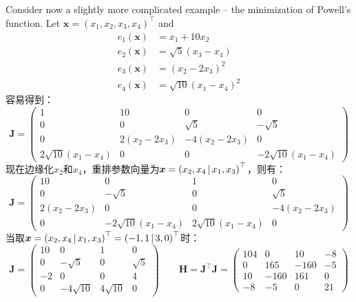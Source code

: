 \documentclass[12pt, onecolumn]{article}
\newcommand\normf{\fangsong}
\begin{document}
	\subsection{\normf{测试案例}}
	Consider now a slightly more complicated example – the minimization of Powell’s function. Let $\boldsymbol{x}=\left( x_1,x_2,x_3,x_4\right) ^\top$ and
	\begin{equation}
	\begin{aligned}
	e_1(\boldsymbol{x})&=x_1+10x_2\\
	e_2(\boldsymbol{x})&=\sqrt{5}\left( x_3-x_4\right) \\
	e_3(\boldsymbol{x})&=\left(x_2-2x_3 \right) ^2\\
	e_4(\boldsymbol{x})&=\sqrt{10}\left( x_1-x_4\right) ^2
	\end{aligned}
	\end{equation}
	容易得到：
	\begin{equation}
	\boldsymbol{J}=\begin{pmatrix}
	1&10&0&0\\
	0&0&\sqrt{5}&-\sqrt{5}\\
	0&2\left( x_2-2x_3\right) &-4\left( x_2-2x_3\right) &0\\
	2\sqrt{10}\left(x_1-x_4 \right) &0&0&-2\sqrt{10}\left(x_1-x_4 \right)
	\end{pmatrix}
	\end{equation}
	现在边缘化$x_2$和$x_4$，重排参数向量为$\boldsymbol{x}=\left( x_2,x_4\;\vline\; x_1,x_3\right) ^\top$，则有：
	\begin{equation}
	\boldsymbol{J}=\left( \begin{array}{cc|cc}
	10&0&1&0\\
	0&-\sqrt{5}&0&\sqrt{5}\\
	2\left( x_2-2x_3\right)&0&0&-4\left( x_2-2x_3\right)\\
	0&-2\sqrt{10}\left(x_1-x_4 \right)&2\sqrt{10}\left(x_1-x_4 \right) &0
	\end{array}\right) 
	\end{equation}
	当取$\boldsymbol{x}=\left( x_2,x_4\;\vline\; x_1,x_3\right) ^\top=\left( -1,1\;\vline\; 3,0\right) ^\top$时：
	\begin{equation}
	\boldsymbol{J}=\left( \begin{array}{cc|cc}
	10&0&1&0\\
	0&-\sqrt{5}&0&\sqrt{5}\\
	-2&0&0&4\\
	0&-4\sqrt{10}&4\sqrt{10}&0
	\end{array}\right) 
	\qquad
	\boldsymbol{H}=\boldsymbol{J}^\top\boldsymbol{J}=\left( \begin{array}{cc|cc}
	104&0&10&-8\\
	0&165&-160&-5\\
	\hline
	10&-160&161&0\\
	-8&-5&0&21
	\end{array}\right) 
	\end{equation}
\end{document}

